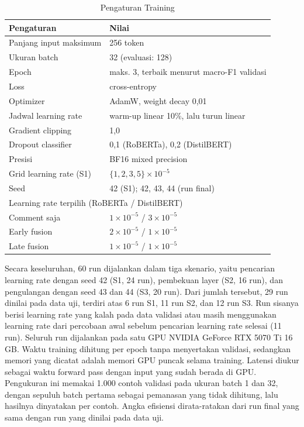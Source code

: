 \documentclass[conference]{IEEEtran}
\begin{document}
\begin{table}[t]
\caption{Pengaturan Training}
\label{tab:setup}
\centering
\begin{tabular}{ll}
\hline
Pengaturan & Nilai \\
\hline
Panjang input maksimum & 256 token \\
Ukuran batch & 32 (evaluasi: 128) \\
Epoch & maks. 3, terbaik menurut macro-F1 validasi \\
Loss & cross-entropy \\
Optimizer & AdamW, weight decay 0,01 \\
Jadwal learning rate & warm-up linear 10\%, lalu turun linear \\
Gradient clipping & 1,0 \\
Dropout classifier & 0,1 (RoBERTa), 0,2 (DistilBERT) \\
Presisi & BF16 mixed precision \\
Grid learning rate (S1) & $\{1, 2, 3, 5\} \times 10^{-5}$ \\
Seed & 42 (S1); 42, 43, 44 (run final) \\
\hline
\multicolumn{2}{l}{Learning rate terpilih (RoBERTa / DistilBERT)} \\
\quad Comment saja & $1 \times 10^{-5}$ / $3 \times 10^{-5}$ \\
\quad Early fusion & $2 \times 10^{-5}$ / $1 \times 10^{-5}$ \\
\quad Late fusion & $1 \times 10^{-5}$ / $1 \times 10^{-5}$ \\
\hline
\end{tabular}
\end{table}

Secara keseluruhan, 60 run dijalankan dalam tiga skenario, yaitu pencarian learning rate dengan seed 42 (S1, 24 run), pembekuan layer (S2, 16 run), dan pengulangan dengan seed 43 dan 44 (S3, 20 run). Dari jumlah tersebut, 29 run dinilai pada data uji, terdiri atas 6 run S1, 11 run S2, dan 12 run S3. Run sisanya berisi learning rate yang kalah pada data validasi atau masih menggunakan learning rate dari percobaan awal sebelum pencarian learning rate selesai (11 run). Seluruh run dijalankan pada satu GPU NVIDIA GeForce RTX 5070 Ti 16 GB. Waktu training dihitung per epoch tanpa menyertakan validasi, sedangkan memori yang dicatat adalah memori GPU puncak selama training. Latensi diukur sebagai waktu forward pass dengan input yang sudah berada di GPU. Pengukuran ini memakai 1.000 contoh validasi pada ukuran batch 1 dan 32, dengan sepuluh batch pertama sebagai pemanasan yang tidak dihitung, lalu hasilnya dinyatakan per contoh. Angka efisiensi dirata-ratakan dari run final yang sama dengan run yang dinilai pada data uji.
\end{document}
